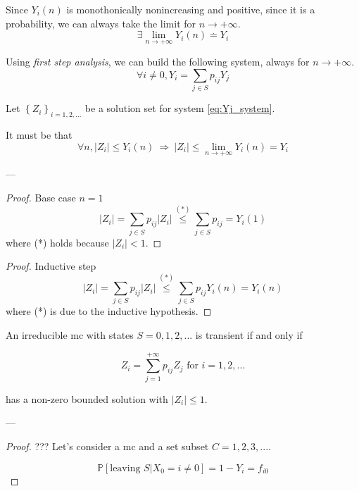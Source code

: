 	\begin{lemma}
		Since $Y_i(n)$ is monothonically nonincreasing and positive, since it is a probability, we can always take the limit for $n \to +\infty$.
		$$ \exists \lim_{n \to +\infty} Y_i(n) \stackrel{.}{=} Y_i $$

		Using \emph{first step analysis}, we can build the following system, always for $n \to +\infty$.
		\begin{equation} \label{eq:Yj_system}
			\forall i \neq 0, Y_i = \sum_{j \in S} p_{ij} Y_j
		\end{equation}
	\end{lemma}

	\begin{lemma}
		Let $\left\{ Z_i \right\}_{i=1, 2, ...}$ be a solution set for system \ref{eq:Yj_system}.

		It must be that
		$$ \forall n, |Z_i| \le Y_i(n) ~ \Rightarrow ~|Z_i| \le \lim_{n \to +\infty} Y_i(n) = Y_i $$
	\end{lemma}
	---
	\begin{proof} Base case $n=1$
		$$ |Z_i| = \sum_{j \in S} p_{ij} |Z_i| \stackrel{(*)}{\le} \sum_{j \in S} p_{ij} = Y_i(1) $$
		where (*) holds because $|Z_i| < 1$.
	\end{proof}

	\begin{proof} Inductive step
		$$ |Z_i| = \sum_{j \in S} p_{ij} |Z_i| \stackrel{(*)}{\le} \sum_{j \in S} p_{ij} Y_i(n) = Y_i(n) $$
		where (*) is due to the inductive hypothesis.
	\end{proof}

	\begin{theorem}
		An irreducible \gls{mc} with states $S = 0, 1, 2, ...$ is transient if and only if

		$$ Z_i = \sum_{j=1}^{+\infty} p_{ij} Z_j \text{ for } i = 1, 2, ...$$

		has a non-zero bounded solution with $ |Z_i| \le 1$.
	\end{theorem}
	---
	\begin{proof} ???
		Let's consider a \gls{mc} and a set subset $C = {1, 2, 3, ...}$.

		$$ \mathbb{P}[\text{leaving } S| X_0 = i \neq 0] = 1 - Y_i = f_{i0} $$

	\end{proof}

